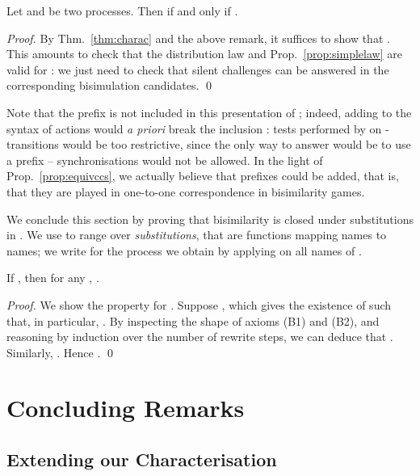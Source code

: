 \documentclass{llncs}
\begin{document}
\begin{prop}\label{prop:equivccs}
  Let  and  be two processes. Then  if and only if
  .
\end{prop}
\begin{proof}
  By Thm.~\ref{thm:charac} and the above remark, it suffices to show
  that . This amounts to check that the
  distribution law and Prop.~\ref{prop:simplelaw} are valid for
  : we just need to check that silent challenges can be
  answered in the corresponding bisimulation candidates.  \qed
\end{proof}

Note that the  prefix is not included in this presentation of
\ccs; indeed, adding  to the syntax of actions  would
\emph{a priori} break the inclusion : tests
performed by  on -transitions would be too restrictive,
since the only way to answer would be to use a  prefix --
synchronisations would not be allowed. In the light of
Prop.~\ref{prop:equivccs}, we actually believe that  prefixes
could be added, that is, that they are played in one-to-one
correspondence in bisimilarity games.


\medskip

We conclude this section by proving that bisimilarity is closed under
substitutions in \miniccs.  We use  to range over
\emph{substitutions}, that are functions mapping names to names; we
write  for the process we obtain by applying  on all
names of .

\begin{prop}
  \label{prop:subst:clos:ccs}
  If , then for any , .
\end{prop}
\begin{proof}
  We show the property for \convert. Suppose , which
  gives the existence of  such that, in particular, .
  By inspecting the shape of axioms (B1) and (B2), and reasoning by
  induction over the number of rewrite steps, we can deduce that
  . Similarly,
  . Hence
  .
\qed
\end{proof}


\section{Concluding Remarks}\label{sec:piccl}

\subsection{Extending our Characterisation}
\label{sec:ccl}
\end{document}
